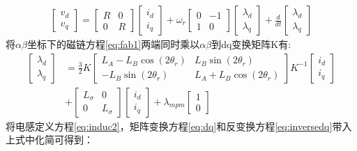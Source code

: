 \begin{align}\label{eq:vdq_final}
\begin{bmatrix}
v_{d}\\v_{q}
\end{bmatrix}
=
\begin{bmatrix}
	R&0\\0&R
\end{bmatrix}
\begin{bmatrix}
	i_{d}\\i_{q}\end{bmatrix}
	+
	\omega_{r}\begin{bmatrix}0&-1\\1&0\end{bmatrix}
	\begin{bmatrix}
	\lambda_{d}\\\lambda_{q}\end{bmatrix}
	+
	\frac{d}{dt}\begin{bmatrix}\lambda_{d}\\\lambda_{q}\end{bmatrix}
\end{align}
将$\alpha\beta$坐标下的磁链方程\ref{eq:fab1}两端同时乘以$\alpha\beta$到dq变换矩阵K有:
\begin{align}
\begin{bmatrix}
\lambda_{d}\\\lambda_{q}
\end{bmatrix}&=
\frac{3}{2}K\begin{bmatrix}
L_{A}-L_{B}\cos(2\theta_{r})&L_{B}\sin(2\theta_{r})\\-L_{B}\sin(2\theta_{r})&L_{A}+L_{B}\cos(2\theta_{r})
\end{bmatrix}K^{-1}\begin{bmatrix}i_{d}\\i_{q}
\end{bmatrix}\nonumber\\&
+\begin{bmatrix}
L_{\sigma}&0\\0&L_{\sigma}
\end{bmatrix}
\begin{bmatrix}
i_{d}\\i_{q}
\end{bmatrix}+
\lambda_{mpm}\begin{bmatrix}
1\\0
\end{bmatrix}
\end{align}
将电感定义方程\ref{eq:induc2}，矩阵变换方程\ref{eq:dq}和反变换方程\ref{eq:inversedq}带入上式中化简可得到：
